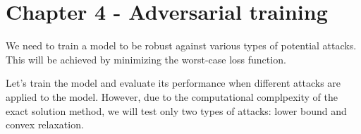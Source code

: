 \section{Chapter 4 - Adversarial training}

We need to train a model to be robust against various types of potential attacks. This will be achieved by 
minimizing the worst-case loss function. 

Let's train the model and evaluate its performance when different attacks are applied to the model. 
However, due to the computational complpexity of the exact solution method, we will test only two types of attacks:
lower bound and convex relaxation. 

